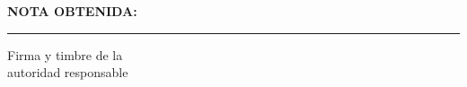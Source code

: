 \thispagestyle{fancy}


\vspace*{0.6 cm}

\begin{flushright}
\begin{minipage}{7.5cm}
    \centering

    {\Large\textbf{NOTA OBTENIDA:}}

    \vspace{3cm}

    \rule{7cm}{0.4pt}

    \vspace{0.4cm}

    {\large Firma y timbre de la}\\
    {\large autoridad responsable}
\end{minipage}
\end{flushright}